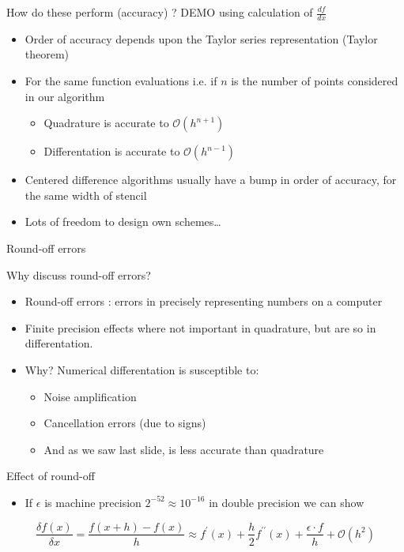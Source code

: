 \documentclass[presentation]{beamer}
\newcommand{\order}[1]{\mathcal O \left( #1 \right)} %
\begin{document}
\begin{frame}[label={sec:org47fa12f}]{How do these perform (accuracy) ?}
\alert{DEMO} using calculation of \(\frac{df}{dx}\)
\begin{itemize}
\item Order of accuracy depends upon the Taylor series representation (\alert{Taylor
theorem})
\item For the same function evaluations i.e. if \(n\) is the number of points
considered in our algorithm
\begin{itemize}
\item Quadrature is accurate to \(\order{h^{n+1}}\)
\item Differentation is accurate to \(\order{h^{n-1}}\)
\end{itemize}
\item Centered difference algorithms usually have a bump in order of accuracy,
for the same width of stencil
\item Lots of freedom to design own schemes\ldots{}
\end{itemize}
\end{frame}
\begin{frame}[label={sec:org7e5ab32}]{Round-off errors}
\begin{block}{Why discuss round-off errors?}
\begin{itemize}
\item Round-off errors : errors in precisely representing numbers on a computer
\item Finite precision effects where not important in quadrature, but are so in
differentation.
\item \alert{Why}? Numerical differentation is susceptible to:
\begin{itemize}
\item Noise amplification
\item Cancellation errors (due to signs)
\item And as we saw last slide, is less accurate than quadrature
\end{itemize}
\end{itemize}
\end{block}
\begin{block}{Effect of round-off}
\begin{itemize}
\item If \(\epsilon\) is machine precision \(2^{-52} \approx 10^{-16}\) in
double precision we can show
\end{itemize}
\[\frac{\delta f(x)}{\delta x} = \frac{f(x+h) - f(x)}{h} \approx
	f^{\prime}(x)  + \frac{h}{2}f^{\prime\prime}(x) + \frac{\epsilon \cdot
	f}{h} + \order{h^2} \]
\end{block}
\end{frame}
\end{document}

